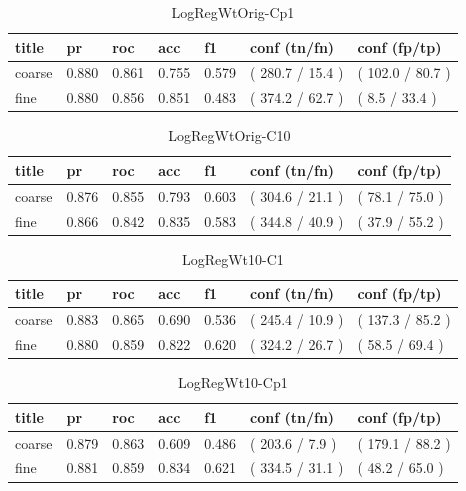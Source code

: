 \documentclass[ms]{nuthesis}
\begin{document}
\FloatBarrier
\begin{table}[H]
\centering
\begin{tabular}{|l||l||l||l||l||l||l|}\toprule
title & pr & roc & acc & f1 & conf (tn/fn) & conf (fp/tp) \\ \midrule
coarse & 0.880 & 0.861 & 0.755 & 0.579 & ( 280.7 / 15.4 ) & ( 102.0 / 80.7 ) \\
fine & 0.880 & 0.856 & 0.851 & 0.483 & ( 374.2 / 62.7 ) & ( 8.5 / 33.4 ) \\ \bottomrule
\end{tabular}
\caption{LogRegWtOrig-Cp1}
\label{tab:LogRegWtOrig-Cp1}
\end{table}
\FloatBarrier


\FloatBarrier
\begin{table}[H]
\centering
\begin{tabular}{|l||l||l||l||l||l||l|}\toprule
title & pr & roc & acc & f1 & conf (tn/fn) & conf (fp/tp) \\ \midrule
coarse & 0.876 & 0.855 & 0.793 & 0.603 & ( 304.6 / 21.1 ) & ( 78.1 / 75.0 ) \\
fine & 0.866 & 0.842 & 0.835 & 0.583 & ( 344.8 / 40.9 ) & ( 37.9 / 55.2 ) \\ \bottomrule
\end{tabular}
\caption{LogRegWtOrig-C10}
\label{tab:LogRegWtOrig-C10}
\end{table}
\FloatBarrier


\FloatBarrier
\begin{table}[H]
\centering
\begin{tabular}{|l||l||l||l||l||l||l|}\toprule
title & pr & roc & acc & f1 & conf (tn/fn) & conf (fp/tp) \\ \midrule
coarse & 0.883 & 0.865 & 0.690 & 0.536 & ( 245.4 / 10.9 ) & ( 137.3 / 85.2 ) \\
fine & 0.880 & 0.859 & 0.822 & 0.620 & ( 324.2 / 26.7 ) & ( 58.5 / 69.4 ) \\ \bottomrule
\end{tabular}
\caption{LogRegWt10-C1}
\label{tab:LogRegWt10-C1}
\end{table}
\FloatBarrier


\FloatBarrier
\begin{table}[H]
\centering
\begin{tabular}{|l||l||l||l||l||l||l|}\toprule
title & pr & roc & acc & f1 & conf (tn/fn) & conf (fp/tp) \\ \midrule
coarse & 0.879 & 0.863 & 0.609 & 0.486 & ( 203.6 / 7.9 ) & ( 179.1 / 88.2 ) \\
fine & 0.881 & 0.859 & 0.834 & 0.621 & ( 334.5 / 31.1 ) & ( 48.2 / 65.0 ) \\ \bottomrule
\end{tabular}
\caption{LogRegWt10-Cp1}
\label{tab:LogRegWt10-Cp1}
\end{table}
\FloatBarrier
\end{document}
